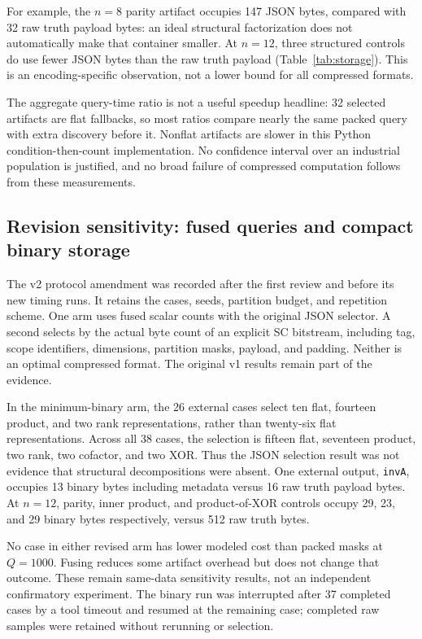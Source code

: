 \documentclass[11pt]{article}
\theoremstyle{definition}\newtheorem{definition}[theorem]{Definition}
\theoremstyle{remark}\newtheorem{remark}[theorem]{Remark}
\begin{document}
For example, the $n=8$ parity artifact occupies 147 JSON bytes, compared with 32 raw truth payload bytes: an ideal structural factorization does not automatically make that container smaller. At $n=12$, three structured controls do use fewer JSON bytes than the raw truth payload (Table~\ref{tab:storage}). This is an encoding-specific observation, not a lower bound for all compressed formats.

The aggregate query-time ratio is not a useful speedup headline: 32 selected artifacts are flat fallbacks, so most ratios compare nearly the same packed query with extra discovery before it. Nonflat artifacts are slower in this Python condition-then-count implementation. No confidence interval over an industrial population is justified, and no broad failure of compressed computation follows from these measurements.


\subsection{Revision sensitivity: fused queries and compact binary storage}
The v2 protocol amendment was recorded after the first review and before its new timing runs. It retains the cases, seeds, partition budget, and repetition scheme. One arm uses fused scalar counts with the original JSON selector. A second selects by the actual byte count of an explicit SC bitstream, including tag, scope identifiers, dimensions, partition masks, payload, and padding. Neither is an optimal compressed format. The original v1 results remain part of the evidence.

In the minimum-binary arm, the 26 external cases select ten flat, fourteen product, and two rank representations, rather than twenty-six flat representations. Across all 38 cases, the selection is fifteen flat, seventeen product, two rank, two cofactor, and two XOR. Thus the JSON selection result was not evidence that structural decompositions were absent. One external output, \texttt{invA}, occupies 13 binary bytes including metadata versus 16 raw truth payload bytes. At $n=12$, parity, inner product, and product-of-XOR controls occupy 29, 23, and 29 binary bytes respectively, versus 512 raw truth bytes.

No case in either revised arm has lower modeled cost than packed masks at $Q=1000$. Fusing reduces some artifact overhead but does not change that outcome. These remain same-data sensitivity results, not an independent confirmatory experiment. The binary run was interrupted after 37 completed cases by a tool timeout and resumed at the remaining case; completed raw samples were retained without rerunning or selection.
\end{document}
